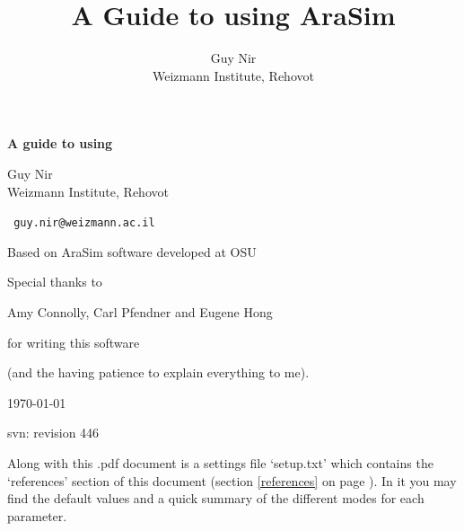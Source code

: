 \documentclass[a4paper,10pt]{article}
\newcommand{\room}{\vspace{0.3cm}}
\newcommand{\arasim}{AraSim\xspace}
\begin{document}
 



\begin{centering}

\title{A Guide to using AraSim}

\noindent\huge \textbf{A guide to using  }

\normalsize
\room

\author{Guy Nir \\ \small Weizmann Institute, Rehovot}

\Large Guy Nir \\ \small Weizmann Institute, Rehovot

\vspace{0.3cm}

\verb| guy.nir@weizmann.ac.il |

\vspace{1cm}

Based on \arasim software developed at OSU

Special thanks to 

Amy Connolly, Carl Pfendner and Eugene Hong 

for writing this software 

(and the having patience to explain everything to me). 

\room

\today

svn: revision 446

\end{centering}

\vspace{3cm}


Along with this .pdf document is a settings file `setup.txt' which contains the `references' section of this document (section \ref{references} on page \pageref{references}). In it you may find the default values and a quick summary of the different modes for each parameter. 



\end{document}
